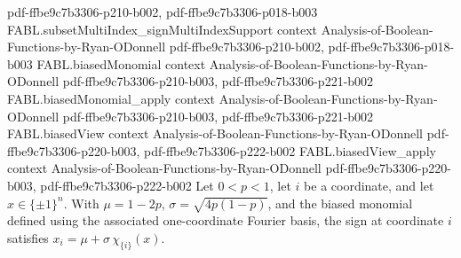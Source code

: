 \begin{theorem}
  {pdf-ffbe9c7b3306-p210-b002,
    pdf-ffbe9c7b3306-p018-b003}
\proofstep
  {FABL.subsetMultiIndex_signMultiIndexSupport}
  {context}
  {Analysis-of-Boolean-Functions-by-Ryan-ODonnell}
  {pdf-ffbe9c7b3306-p210-b002,
    pdf-ffbe9c7b3306-p018-b003}
\proofstep
  {FABL.biasedMonomial}
  {context}
  {Analysis-of-Boolean-Functions-by-Ryan-ODonnell}
  {pdf-ffbe9c7b3306-p210-b003,
    pdf-ffbe9c7b3306-p221-b002}
\proofstep
  {FABL.biasedMonomial_apply}
  {context}
  {Analysis-of-Boolean-Functions-by-Ryan-ODonnell}
  {pdf-ffbe9c7b3306-p210-b003,
    pdf-ffbe9c7b3306-p221-b002}
\proofstep
  {FABL.biasedView}
  {context}
  {Analysis-of-Boolean-Functions-by-Ryan-ODonnell}
  {pdf-ffbe9c7b3306-p220-b003,
    pdf-ffbe9c7b3306-p222-b002}
\proofstep
  {FABL.biasedView_apply}
  {context}
  {Analysis-of-Boolean-Functions-by-Ryan-ODonnell}
  {pdf-ffbe9c7b3306-p220-b003,
    pdf-ffbe9c7b3306-p222-b002}
Let $0<p<1$, let $i$ be a coordinate, and let $x\in\{\pm1\}^n$. With $\mu=1-2p$,
$\sigma=\sqrt{4p(1-p)}$, and the biased monomial defined using the associated
one-coordinate Fourier basis, the sign at coordinate $i$ satisfies
$x_i=\mu+\sigma\,\chi_{\{i\}}(x)$.
\end{theorem}

